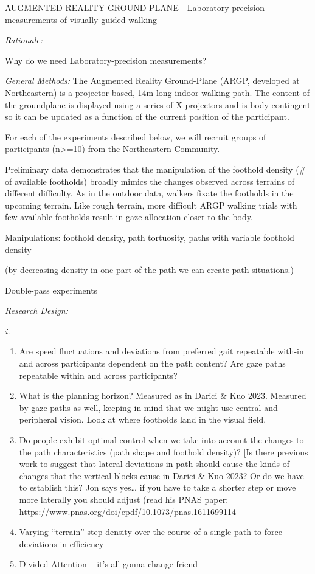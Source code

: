 AUGMENTED REALITY GROUND PLANE - Laboratory-precision measurements of
visually-guided walking

\emph{Rationale:}

Why do we need Laboratory-precision measurements?

\emph{General Methods:} The Augmented Reality Ground-Plane (ARGP,
developed at Northeastern) is a projector-based, 14m-long indoor walking
path. The content of the groundplane is displayed using a series of X
projectors and is body-contingent so it can be updated as a function of
the current position of the participant.

For each of the experiments described below, we will recruit groups of
participants (n\textgreater=10) from the Northeastern Community.

Preliminary data demonstrates that the manipulation of the foothold
density (\# of available footholds) broadly mimics the changes observed
across terrains of different difficulty. As in the outdoor data, walkers
fixate the footholds in the upcoming terrain. Like rough terrain, more
difficult ARGP walking trials with few available footholds result in
gaze allocation closer to the body.

Manipulations: foothold density, path tortuosity, paths with variable
foothold density

(by decreasing density in one part of the path we can create path
situations.)

Double-pass experiments

\emph{Research Design:}

\emph{i.}

\begin{enumerate}
\def\labelenumi{\Alph{enumi}.}
\item
  Are speed fluctuations and deviations from preferred gait repeatable
  with-in and across participants dependent on the path content? Are
  gaze paths repeatable within and across participants?
\item
  What is the planning horizon? Measured as in Darici \& Kuo 2023.
  Measured by gaze paths as well, keeping in mind that we might use
  central and peripheral vision. Look at where footholds land in the
  visual field.
\item
  Do people exhibit optimal control when we take into account the
  changes to the path characteristics (path shape and foothold density)?
  {[}Is there previous work to suggest that lateral deviations in path
  should cause the kinds of changes that the vertical blocks cause in
  Darici \& Kuo 2023? Or do we have to establish this? Jon says
  yes\ldots{} if you have to take a shorter step or move more laterally
  you should adjust (read his PNAS paper:
  \href{https://www.pnas.org/doi/epdf/10.1073/pnas.1611699114}{\ul{https://www.pnas.org/doi/epdf/10.1073/pnas.1611699114}}
\item
  Varying ``terrain'' step density over the course of a single path to
  force deviations in efficiency
\item
  Divided Attention -- it's all gonna change friend
\end{enumerate}



